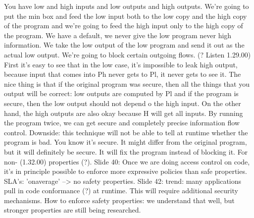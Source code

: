 \documentclass[10pt,a4paper]{report}
\begin{document}
You have low and high inputs and low outputs and high outputs. We're going to put the min box and feed the low input both to the low copy and the high copy of the program and we're going to feed the high input only to the high copy of the program.
We have a default, we never give the low program never high information. We take the low output of the low program and send it out as the actual low output. We're going to block certain outgoing flows. 
(? Listen 1.29.00)
First it's easy to see that in the low case, it's impossible to leak high output, because input that comes into Ph never gets to Pl, it never gets to see it. The nice thing is that if the original program was secure, then all the things that you output will be correct: low outputs are computed by Pl and if the program is secure, then the low output should not depend o the high input. On the other hand, the high outputs are also okay because H will get all inputs.
By running the program twice, we can get secure and completely precise information flow control.
Downside: this technique will not be able to tell at runtime whether the program is bad. You know it's secure. It might differ from the original program, but it will definitely be secure. It will fix the program instead of blocking it. For non- (1.32.00) properties (?).
Slide 40: Once we are doing access control on code, it's in principle possible to enforce more expressive policies than safe properties.
SLA's: 'onaverage' --> no safety properties.
Slide 42: trend: many applications pull in code conformance (?) at runtime. 
This will require additional security mechanisms.
How to enforce safety properties: we understand that well, but stronger properties are still being researched.
\end{document}
